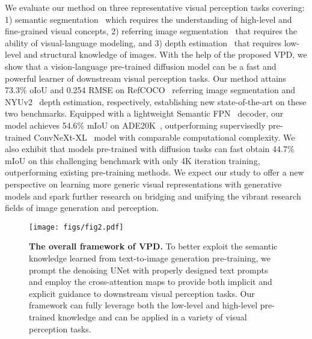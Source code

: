\documentclass[10pt,twocolumn,letterpaper]{article}
\begin{document}
We evaluate our method on three representative visual perception tasks covering: 1) semantic segmentation~\cite{zhou2017ade} which requires the understanding of high-level and fine-grained visual concepts, 2) referring image segmentation~\cite{yu2016refcoco,nagaraja2016gref_umd} that requires the ability of visual-language modeling, and 3) depth estimation~\cite{silberman2012nyuv2} that requires low-level and structural knowledge of images. With the help of the proposed VPD,  we show that a vision-language pre-trained diffusion model can be a fast and powerful learner of downstream visual perception tasks. Our method attains 73.3\% oIoU and 0.254 RMSE on RefCOCO~\cite{yu2016refcoco} referring image segmentation and NYUv2~\cite{silberman2012nyuv2} depth estimation, respectively, establishing new state-of-the-art on these two benchmarks. Equipped with a lightweight Semantic FPN~\cite{kirillov2019semanticfpn} decoder, our model achieves 54.6\% mIoU on ADE20K~\cite{zhou2017ade}, outperforming supervisedly pre-trained ConvNeXt-XL~\cite{liu2022convnet} model with comparable computational complexity. We also exhibit that models pre-trained with diffusion tasks can fast obtain 44.7\% mIoU on this challenging benchmark with only 4K iteration training, outperforming existing pre-training methods. We expect our study to offer a new perspective on learning more generic visual representations with generative models and spark further research on bridging and unifying the vibrant research fields of image generation and perception. 

\begin{figure*}[t]
\begin{center}
\texttt{[image: figs/fig2.pdf]}
\end{center}
   \caption{\textbf{The overall framework of VPD.} To better exploit the semantic knowledge learned from text-to-image generation pre-training, we prompt the denoising UNet with properly designed text prompts and employ the cross-attention maps to provide both implicit and explicit guidance to downstream visual perception tasks. Our framework can fully leverage both the low-level and high-level pre-trained knowledge and can be applied in a variety of visual perception tasks.}
\label{fig:overall}
\vspace{-10pt}
\end{figure*}
\end{document}
